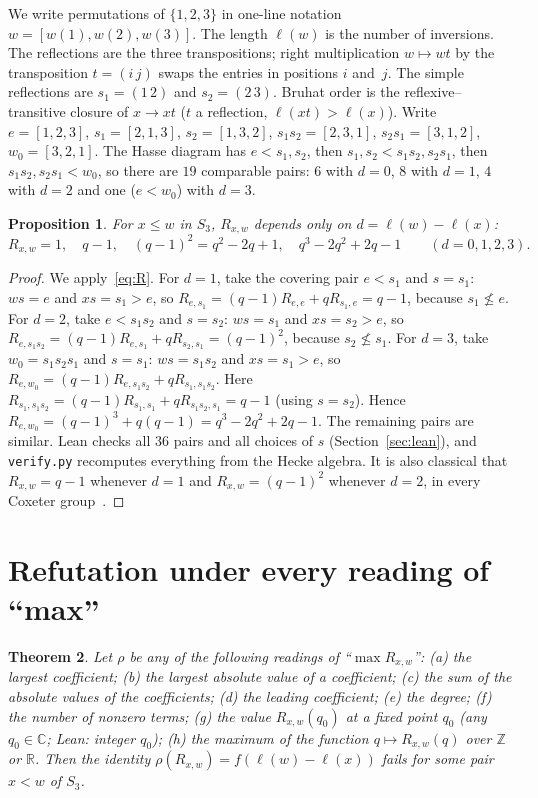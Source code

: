 \documentclass[11pt]{article}
\newtheorem{theorem}{Theorem}
\newtheorem{proposition}[theorem]{Proposition}
\theoremstyle{remark}
\begin{document}
We write permutations of $\{1,2,3\}$ in one-line notation $w=[w(1),w(2),w(3)]$.
The length $\ell(w)$ is the number of inversions. The reflections are the three
transpositions; right multiplication $w\mapsto wt$ by the transposition $t=(i\,j)$
swaps the entries in positions $i$ and~$j$. The simple reflections are
$s_1=(1\,2)$ and $s_2=(2\,3)$. Bruhat order is the reflexive--transitive closure
of $x\to xt$ ($t$ a reflection, $\ell(xt)>\ell(x)$). Write
$e=[1,2,3]$, $s_1=[2,1,3]$, $s_2=[1,3,2]$, $s_1s_2=[2,3,1]$, $s_2s_1=[3,1,2]$,
$w_0=[3,2,1]$. The Hasse diagram has $e<s_1,s_2$, then $s_1,s_2<s_1s_2,s_2s_1$,
then $s_1s_2,s_2s_1<w_0$, so there are $19$ comparable pairs: $6$ with $d=0$,
$8$ with $d=1$, $4$ with $d=2$ and one ($e<w_0$) with $d=3$.

\begin{proposition}\label{prop:S3}
For $x\le w$ in $S_3$, $R_{x,w}$ depends only on $d=\ell(w)-\ell(x)$:
\[
R_{x,w}=1,\quad q-1,\quad (q-1)^2=q^2-2q+1,\quad q^3-2q^2+2q-1
\qquad (d=0,1,2,3).
\]
\end{proposition}

\begin{proof}
We apply~\eqref{eq:R}. For $d=1$, take the covering pair $e<s_1$ and $s=s_1$: $ws=e$
and $xs=s_1>e$, so $R_{e,s_1}=(q-1)R_{e,e}+qR_{s_1,e}=q-1$, because
$s_1\not\le e$. For $d=2$, take $e<s_1s_2$ and $s=s_2$: $ws=s_1$ and $xs=s_2>e$,
so $R_{e,s_1s_2}=(q-1)R_{e,s_1}+qR_{s_2,s_1}=(q-1)^2$, because $s_2\not\le s_1$.
For $d=3$, take $w_0=s_1s_2s_1$ and $s=s_1$: $ws=s_1s_2$ and $xs=s_1>e$, so
$R_{e,w_0}=(q-1)R_{e,s_1s_2}+qR_{s_1,s_1s_2}$. Here
$R_{s_1,s_1s_2}=(q-1)R_{s_1,s_1}+qR_{s_1s_2,s_1}=q-1$ (using $s=s_2$). Hence
$R_{e,w_0}=(q-1)^3+q(q-1)=q^3-2q^2+2q-1$. The remaining pairs are similar.
Lean checks all $36$ pairs and all choices of $s$ (Section~\ref{sec:lean}), and
\texttt{verify.py} recomputes everything from the Hecke algebra. It is also
classical that $R_{x,w}=q-1$ whenever $d=1$ and $R_{x,w}=(q-1)^2$ whenever $d=2$,
in every Coxeter group~\cite[Ch.~5]{bb}.
\end{proof}

\section{Refutation under every reading of ``max''}\label{sec:readings}

\begin{theorem}\label{thm:main}
Let $\rho$ be any of the following readings of ``$\max R_{x,w}$'':
(a) the largest coefficient; (b) the largest absolute value of a coefficient;
(c) the sum of the absolute values of the coefficients; (d) the leading
coefficient; (e) the degree; (f) the number of nonzero terms; (g) the value
$R_{x,w}(q_0)$ at a fixed point $q_0$ (any $q_0\in\mathbb C$; Lean: integer $q_0$); (h) the maximum
of the function $q\mapsto R_{x,w}(q)$ over $\mathbb Z$ or $\mathbb R$. Then the identity
$\rho(R_{x,w})=f(\ell(w)-\ell(x))$ fails for some pair $x<w$ of $S_3$.
\end{theorem}
\end{document}

